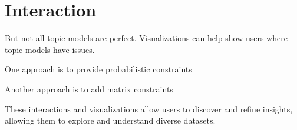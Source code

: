 \section{Interaction}

But not all topic models are perfect.  Visualizations can help show
users where topic models have issues.

One approach is to provide probabilistic constraints~\citep{hu-14:itm}

Another approach is to add matrix constraints~\citep{choo-13}

These interactions and visualizations allow users to discover and
refine insights, allowing them to explore and understand diverse
datasets.